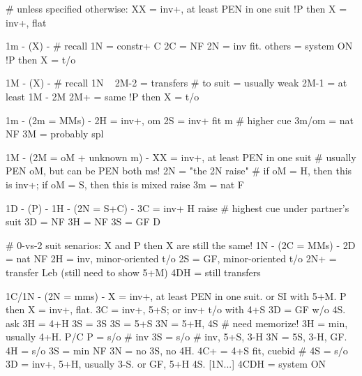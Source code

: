 # unless specified otherwise:
XX = inv+, at least PEN in one suit
!P then X = inv+, flat

1m - (X) -  # recall
1N = constr+ C
2C = NF
2N = inv fit.
others = system ON
!P then X = t/o

1M - (X) -  # recall
1N ~ 2M-2 = transfers  # to suit = usually weak
2M-1 = at least 1M - 2M
2M+ = same
!P then X = t/o

1m - (2m = MMs) -
2H = inv+, om
2S = inv+ fit m  # higher cue
3m/om = nat NF
3M = probably spl

1M - (2M = oM + unknown m) -
XX = inv+, at least PEN in one suit  # usually PEN oM, but can be PEN both ms!
2N = "the 2N raise"  # if oM = H, then this is inv+; if oM = S, then this is mixed raise
3m = nat F

1D - (P) - 1H - (2N = S+C) -
3C = inv+ H raise  # highest cue under partner's suit
3D = NF
3H = NF
3S = GF D

# 0-vs-2 suit senarios: X and P then X are still the same!
1N - (2C = MMs) - 
2D = nat NF
2H = inv, minor-oriented t/o
2S = GF, minor-oriented t/o
2N+ = transfer Leb (still need to show 5+M)
4DH = still transfers

1C/1N - (2N = mms) - 
X = inv+, at least PEN in one suit. or SI with 5+M.
P then X = inv+, flat.
3C = inv+, 5+S; or inv+ t/o with 4+S
    3D = GF w/o 4S. ask
        3H = 4+H
            3S = 3S
        3S = 5+S
        3N = 5+H, 4S  # need memorize!
    3H = min, usually 4+H. P/C
        P = s/o  # inv
        3S = s/o  # inv, 5+S, 3-H
        3N = 5S, 3-H, GF.
        4H = s/o
    3S = min NF
    3N = no 3S, no 4H.
    4C+ = 4+S fit, cuebid  # 4S = s/o
3D = inv+, 5+H, usually 3-S. or GF, 5+H 4S.
[1N...] 4CDH = system ON